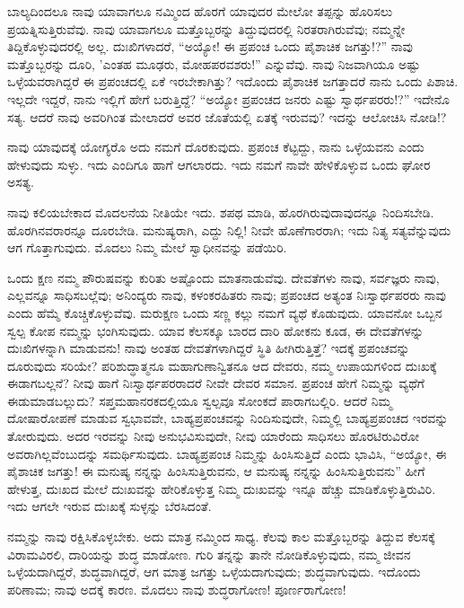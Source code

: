 ಬಾಲ್ಯದಿಂದಲೂ ನಾವು ಯಾವಾಗಲೂ ನಮ್ಮಿಂದ ಹೊರಗೆ ಯಾವುದರ ಮೇಲೋ ತಪ್ಪನ್ನು ಹೊರಿಸಲು ಪ್ರಯತ್ನಿಸುತ್ತಿರುವೆವು. ನಾವು ಯಾವಾಗಲೂ ಮತ್ತೊಬ್ಬರನ್ನು ತಿದ್ದುವುದರಲ್ಲಿ ನಿರತರಾಗಿರುವೆವು; ನಮ್ಮನ್ನೇ ತಿದ್ದಿಕೊಳ್ಳುವುದರಲ್ಲಿ ಅಲ್ಲ. ದುಃಖಿಗಳಾದರೆ, “ಅಯ್ಯೋ! ಈ ಪ್ರಪಂಚ ಒಂದು ಪೈಶಾಚಿಕ ಜಗತ್ತು!?” ನಾವು ಮತ್ತೊಬ್ಬರನ್ನು ದೂರಿ, 'ಎಂತಹ ಮೂಢರು, ಮೋಹಪರವಶರು!'' ಎನ್ನುವೆವು. ನಾವು ನಿಜವಾಗಿಯೂ ಅಷ್ಟು ಒಳ್ಳೆಯವರಾಗಿದ್ದರೆ ಈ ಪ್ರಪಂಚದಲ್ಲಿ ಏಕೆ ಇರಬೇಕಾಗಿತ್ತು? ಇದೊಂದು ಪೈಶಾಚಿಕ ಜಗತ್ತಾದರೆ ನಾನು ಒಂದು ಪಿಶಾಚಿ. ಇಲ್ಲದೇ ಇದ್ದರೆ, ನಾನು ಇಲ್ಲಿಗೆ ಹೇಗೆ ಬರುತ್ತಿದ್ದೆ? “ಅಯ್ಯೋ ಪ್ರಪಂಚದ ಜನರು ಎಷ್ಟು ಸ್ವಾರ್ಥಪರರು!?” ಇದೇನೊ ಸತ್ಯ. ಆದರೆ ನಾವು ಅವರಿಗಿಂತ ಮೇಲಾದರೆ ಅವರ ಜೊತೆಯಲ್ಲಿ ಏತಕ್ಕೆ ಇರುವವು? ಇದನ್ನು ಆಲೋಚಿಸಿ ನೋಡಿ!?

ನಾವು ಯಾವುದಕ್ಕೆ ಯೋಗ್ಯರೊ ಅದು ನಮಗೆ ದೊರಕುವುದು. ಪ್ರಪಂಚ ಕೆಟ್ಟದ್ದು, ನಾನು ಒಳ್ಳೆಯವನು ಎಂದು ಹೇಳುವುದು ಸುಳ್ಳು. ಇದು ಎಂದಿಗೂ ಹಾಗೆ ಆಗಲಾರದು. ಇದು ನಮಗೆ ನಾವೇ ಹೇಳಿಕೊಳ್ಳುವ ಒಂದು ಘೋರ ಅಸತ್ಯ.

ನಾವು ಕಲಿಯಬೇಕಾದ ಮೊದಲನೆಯ ನೀತಿಯೇ ಇದು. ಶಪಥ ಮಾಡಿ, ಹೊರಗಿರುವುದಾವುದನ್ನೂ ನಿಂದಿಸಬೇಡಿ. ಹೊರಗಿನವರಾರನ್ನೂ ದೂರಬೇಡಿ. ಮನುಷ್ಯರಾಗಿ, ಎದ್ದು ನಿಲ್ಲಿ! ನೀವೇ ಹೊಣೆಗಾರರಾಗಿ; ಇದು ನಿತ್ಯ ಸತ್ಯವೆನ್ನುವುದು ಆಗ ಗೊತ್ತಾಗುವುದು. ಮೊದಲು ನಿಮ್ಮ ಮೇಲೆ ಸ್ವಾಧೀನವನ್ನು ಪಡೆಯಿರಿ.

ಒಂದು ಕ್ಷಣ ನಮ್ಮ ಪೌರುಷವನ್ನು ಕುರಿತು ಅಷ್ಟೊಂದು ಮಾತನಾಡುವೆವು. ದೇವತೆಗಳು ನಾವು, ಸರ್ವಜ್ಞರು ನಾವು, ಎಲ್ಲವನ್ನೂ ಸಾಧಿಸಬಲ್ಲೆವು; ಅನಿಂದ್ಯರು ನಾವು, ಕಳಂಕರಹಿತರು ನಾವು; ಪ್ರಪಂಚದ ಅತ್ಯಂತ ನಿಃಸ್ವಾರ್ಥಪರರು ನಾವು ಎಂದು ಹೆಮ್ಮೆ ಕೊಚ್ಚಿಕೊಳ್ಳುವೆವು. ಮರುಕ್ಷಣ ಒಂದು ಸಣ್ಣ ಕಲ್ಲು ನಮಗೆ ವ್ಯಥೆ ಕೊಡುವುದು. ಯಾವನೋ ಒಬ್ಬನ ಸ್ವಲ್ಪ ಕೋಪ ನಮ್ಮನ್ನು ಭಂಗಿಸುವುದು. ಯಾವ ಕೆಲಸಕ್ಕೂ ಬಾರದ ದಾರಿ ಹೋಕನು ಕೂಡ, ಈ ದೇವತೆಗಳನ್ನು ದುಃಖಿಗಳನ್ನಾಗಿ ಮಾಡುವನು! ನಾವು ಅಂತಹ ದೇವತೆಗಳಾಗಿದ್ದರೆ ಸ್ಥಿತಿ ಹೀಗಿರುತ್ತಿತ್ತೆ? ಇದಕ್ಕೆ ಪ್ರಪಂಚವನ್ನು ದೂರುವುದು ಸರಿಯೇ? ಪರಿಶುದ್ಧಾತ್ಮನೂ ಮಹಾಗುಣಾನ್ವಿತನೂ ಆದ ದೇವರು, ನಮ್ಮ ಉಪಾಯಗಳಿಂದ ದುಃಖಕ್ಕೆ ಈಡಾಗಬಲ್ಲನೆ? ನೀವು ಹಾಗೆ ನಿಃಸ್ವಾರ್ಥಪರರಾದರೆ ನೀವೇ ದೇವರ ಸಮಾನ. ಪ್ರಪಂಚ ಹೇಗೆ ನಿಮ್ಮನ್ನು ವ್ಯಥೆಗೆ ಈಡುಮಾಡಬಲ್ಲುದು? ಸಪ್ತಮಹಾನರಕದಲ್ಲಿಯೂ ಸ್ವಲ್ಪವೂ ಸೋಂಕದೆ ಪಾರಾಗಬಲ್ಲಿರಿ. ಆದರೆ ನಿಮ್ಮ ದೋಷಾರೋಪಣೆ ಮಾಡುವ ಸ್ವಭಾವವೇ, ಬಾಹ್ಯಪ್ರಪಂಚವನ್ನು ನಿಂದಿಸುವುದೇ, ನಿಮ್ಮಲ್ಲಿ ಬಾಹ್ಯಪ್ರಪಂಚದ ಇರವನ್ನು ತೋರುವುದು. ಅದರ ಇರವನ್ನು ನೀವು ಅನುಭವಿಸುವುದೇ, ನೀವು ಯಾರೆಂದು ಸಾಧಿಸಲು ಹೊರಟಿರುವಿರೋ ಅವರಾಗಿಲ್ಲವೆಂಬುದನ್ನು ಸಮರ್ಥಿಸುವುದು. ಬಾಹ್ಯಪ್ರಪಂಚ ನಿಮ್ಮನ್ನು ಹಿಂಸಿಸುತ್ತಿದೆ ಎಂದು ಭಾವಿಸಿ, “ಅಯ್ಯೋ, ಈ ಪೈಶಾಚಿಕ ಜಗತ್ತು! ಈ ಮನುಷ್ಯ ನನ್ನನ್ನು ಹಿಂಸಿಸುತ್ತಿರುವನು, ಆ ಮನುಷ್ಯ ನನ್ನನ್ನು ಹಿಂಸಿಸುತ್ತಿರುವನು” ಹೀಗೆ ಹೇಳುತ್ತ, ದುಃಖದ ಮೇಲೆ ದುಃಖವನ್ನು ಹೇರಿಕೊಳ್ಳುತ್ತ ನಿಮ್ಮ ದುಃಖವನ್ನು ಇನ್ನೂ ಹೆಚ್ಚು ಮಾಡಿಕೊಳ್ಳುತ್ತಿರುವಿರಿ. ಇದು ಆಗಲೇ ಇರುವ ದುಃಖಕ್ಕೆ ಸುಳ್ಳನ್ನು ಬೆರಸಿದಂತೆ.

ನಮ್ಮನ್ನು ನಾವು ರಕ್ಷಿಸಿಕೊಳ್ಳಬೇಕು. ಅದು ಮಾತ್ರ ನಮ್ಮಿಂದ ಸಾಧ್ಯ. ಕೆಲವು ಕಾಲ ಮತ್ತೊಬ್ಬರನ್ನು ತಿದ್ದುವ ಕೆಲಸಕ್ಕೆ ವಿರಾಮವಿರಲಿ, ದಾರಿಯನ್ನು ಶುದ್ಧ ಮಾಡೋಣ. ಗುರಿ ತನ್ನನ್ನು ತಾನೇ ನೋಡಿಕೊಳ್ಳುವುದು, ನಮ್ಮ ಜೀವನ ಒಳ್ಳೆಯದಾಗಿದ್ದರೆ, ಶುದ್ಧವಾಗಿದ್ದರೆ, ಆಗ ಮಾತ್ರ ಜಗತ್ತು ಒಳ್ಳೆಯದಾಗುವುದು; ಶುದ್ಧವಾಗುವುದು. ಇದೊಂದು ಪರಿಣಾಮ; ನಾವು ಅದಕ್ಕೆ ಕಾರಣ. ಮೊದಲು ನಾವು ಶುದ್ಧರಾಗೋಣ! ಪೂರ್ಣರಾಗೋಣ!

